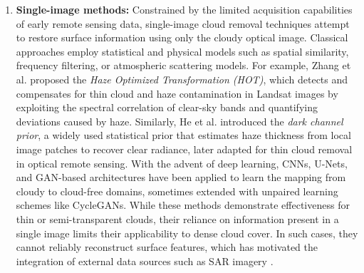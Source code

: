 \begin{enumerate}[label=(\Alph*)]
  \item \textbf{Single-image methods:} Constrained by the limited acquisition capabilities of early remote sensing data, single-image cloud removal techniques attempt to restore surface information using only the cloudy optical image. Classical approaches employ statistical and physical models such as spatial similarity, frequency filtering, or atmospheric scattering models. For example, Zhang et al. \cite{single_variation} proposed the \emph{Haze Optimized Transformation (HOT)}, which detects and compensates for thin cloud and haze contamination in Landsat images by exploiting the spectral correlation of clear-sky bands and quantifying deviations caused by haze. Similarly, He et al. \cite{single_haze_removal_dark_prior} introduced the \emph{dark channel prior}, a widely used statistical prior that estimates haze thickness from local image patches to recover clear radiance, later adapted for thin cloud removal in optical remote sensing. With the advent of deep learning, CNNs, U-Nets, and GAN-based architectures have been applied to learn the mapping from cloudy to cloud-free domains, sometimes extended with unpaired learning schemes like CycleGANs. While these methods demonstrate effectiveness for thin or semi-transparent clouds, their reliance on information present in a single image limits their applicability to dense cloud cover. In such cases, they cannot reliably reconstruct surface features, which has motivated the integration of external data sources such as SAR imagery \cite{CR_Advances_Review_ORS}.


\end{enumerate}
